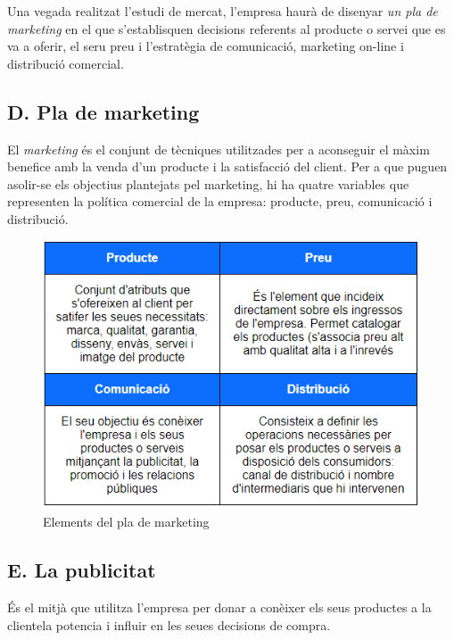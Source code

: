 \documentclass[
]{book}
\begin{document}
Una vegada realitzat l'estudi de mercat, l'empresa haurà de disenyar \emph{un pla de marketing} en el que s'establisquen decisions referents al producte o servei que es va a oferir, el seru preu i l'estratègia de comunicació, marketing on-line i distribució comercial.

\hypertarget{d.-pla-de-marketing}{%
\subsection*{D. Pla de marketing}\label{d.-pla-de-marketing}}

El \emph{marketing} és el conjunt de tècniques utilitzades per a aconseguir el màxim benefice amb la venda d'un producte i la satisfacció del client. Per a que puguen asolir-se els objectius plantejats pel marketing, hi ha quatre variables que representen la política comercial de la empresa: producte, preu, comunicació i distribució.

\begin{figure}
\centering
\includegraphics{tablaMarketing.png}
\caption{\label{fig:unnamed-chunk-1}Elements del pla de marketing}
\end{figure}

\hypertarget{e.-la-publicitat}{%
\subsection*{E. La publicitat}\label{e.-la-publicitat}}

És el mitjà que utilitza l'empresa per donar a conèixer els seus productes a la clientela potencia i influir en les seues decisions de compra.
\end{document}
